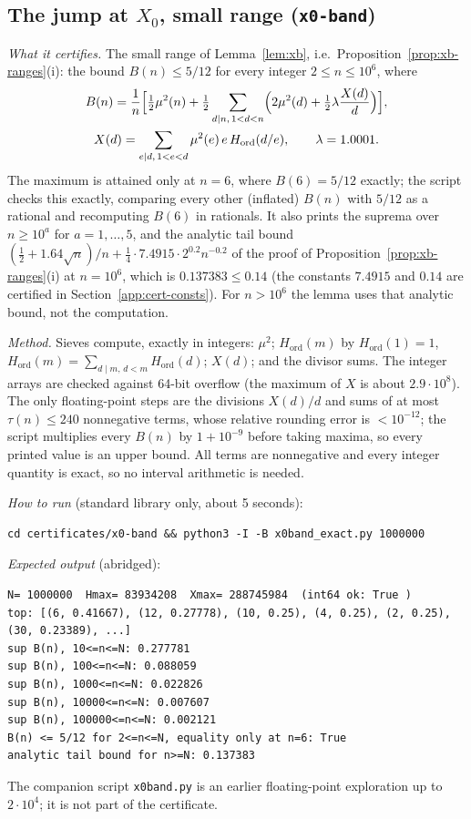 \subsection{The jump at \texorpdfstring{$X_0$}{X0}, small range (\texttt{x0-band})}\label{app:cert-x0band}
\emph{What it certifies.} The small range of Lemma~\ref{lem:xb}, i.e.\ Proposition~\ref{prop:xb-ranges}(i): the bound $B(n)\le5/12$ for every integer $2\le n\le10^6$, where
\[
\begin{gathered}
  B(n)=\frac1n\Bigl[\tfrac12\mu^2(n)+\tfrac12\sum_{d\mid n,\,1<d<n}\Bigl(2\mu^2(d)+\tfrac12\lambda\frac{X(d)}d\Bigr)\Bigr],\\
  X(d)=\sum_{e\mid d,\,1<e<d}\mu^2(e)\,e\,H_{\mathrm{ord}}(d/e),\qquad\lambda=1.0001.
\end{gathered}
\]
The maximum is attained only at $n=6$, where $B(6)=5/12$ exactly; the script checks this exactly, comparing every other
(inflated) $B(n)$ with $5/12$ as a rational and recomputing $B(6)$ in rationals. It also prints the suprema over $n\ge10^a$ for
$a=1,\dots,5$, and the analytic tail bound $(\tfrac12+1.64\sqrt n)/n+\tfrac14\cdot7.4915\cdot2^{0.2}n^{-0.2}$ of the proof of
Proposition~\ref{prop:xb-ranges}(i) at $n=10^6$, which is $0.137383\le0.14$ (the constants $7.4915$ and $0.14$ are certified in
Section~\ref{app:cert-consts}). For $n>10^6$ the lemma uses that analytic bound, not the computation.

\emph{Method.} Sieves compute, exactly in integers: $\mu^2$; $H_{\mathrm{ord}}(m)$ by $H_{\mathrm{ord}}(1)=1$,
$H_{\mathrm{ord}}(m)=\sum_{d\mid m,\,d<m}H_{\mathrm{ord}}(d)$; $X(d)$; and the divisor sums. The integer arrays are checked against
64-bit overflow (the maximum of $X$ is about $2.9\cdot10^8$). The only floating-point steps are the divisions $X(d)/d$ and sums of at
most $\tau(n)\le240$ nonnegative terms, whose relative rounding error is $<10^{-12}$; the script multiplies every $B(n)$ by
$1+10^{-9}$ before taking maxima, so every printed value is an upper bound. All terms are nonnegative and every integer quantity is
exact, so no interval arithmetic is needed.

\emph{How to run} (standard library only, about 5 seconds):
\begingroup\footnotesize
\begin{verbatim}
cd certificates/x0-band && python3 -I -B x0band_exact.py 1000000
\end{verbatim}
\endgroup
\emph{Expected output} (abridged):
\begingroup\footnotesize
\begin{verbatim}
N= 1000000  Hmax= 83934208  Xmax= 288745984  (int64 ok: True )
top: [(6, 0.41667), (12, 0.27778), (10, 0.25), (4, 0.25), (2, 0.25), (30, 0.23389), ...]
sup B(n), 10<=n<=N: 0.277781
sup B(n), 100<=n<=N: 0.088059
sup B(n), 1000<=n<=N: 0.022826
sup B(n), 10000<=n<=N: 0.007607
sup B(n), 100000<=n<=N: 0.002121
B(n) <= 5/12 for 2<=n<=N, equality only at n=6: True
analytic tail bound for n>=N: 0.137383
\end{verbatim}
\endgroup
The companion script \texttt{x0band.py} is an earlier floating-point exploration up to $2\cdot10^4$; it is not part of the certificate.


